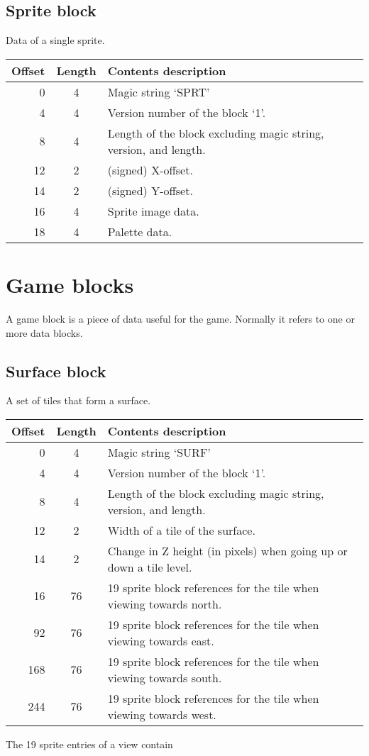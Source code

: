 \documentclass{article}
\begin{document}
\subsection{Sprite block}
Data of a single sprite.

\begin{center}
\begin{tabular}{|r|c|l|} \hline
\textbf{Offset} & \textbf{Length} & \textbf{Contents description} \\ \hline
 0 & 4 & Magic string `SPRT' \\
 4 & 4 & Version number of the block `1'. \\
 8 & 4 & Length of the block excluding magic string, version, and length. \\
12 & 2 & (signed) X-offset. \\
14 & 2 & (signed) Y-offset. \\
16 & 4 & Sprite image data. \\
18 & 4 & Palette data. \\ \hline
\end{tabular}
\end{center}


\section{Game blocks}
A game block is a piece of data useful for the game. Normally it refers to one
or more data blocks.

\subsection{Surface block}
A set of tiles that form a surface.

\begin{center}
\begin{tabular}{|r|c|l|} \hline
\textbf{Offset} & \textbf{Length} & \textbf{Contents description} \\ \hline
  0 & 4 & Magic string `SURF' \\
  4 & 4 & Version number of the block `1'. \\
  8 & 4 & Length of the block excluding magic string, version, and length. \\
 12 & 2 & Width of a tile of the surface. \\
 14 & 2 & Change in Z height (in pixels) when going up or down a tile level. \\
 16 & 76 & 19 sprite block references for the tile when viewing towards north. \\
 92 & 76 & 19 sprite block references for the tile when viewing towards east.  \\
168 & 76 & 19 sprite block references for the tile when viewing towards south. \\
244 & 76 & 19 sprite block references for the tile when viewing towards west.  \\ \hline
\end{tabular}
\end{center}
The 19 sprite entries of a view contain
\end{document}
